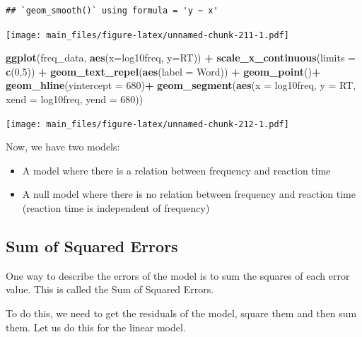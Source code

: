 \documentclass[
]{book}
\newenvironment{Shaded}{\begin{snugshade}}{\end{snugshade}}
\newcommand{\AttributeTok}[1]{\textcolor[rgb]{0.13,0.29,0.53}{#1}}
\newcommand{\DecValTok}[1]{\textcolor[rgb]{0.00,0.00,0.81}{#1}}
\newcommand{\FunctionTok}[1]{\textcolor[rgb]{0.13,0.29,0.53}{\textbf{#1}}}
\newcommand{\NormalTok}[1]{#1}
\newcommand{\SpecialCharTok}[1]{\textcolor[rgb]{0.81,0.36,0.00}{\textbf{#1}}}
\providecommand{\tightlist}{%
  \setlength{\itemsep}{0pt}\setlength{\parskip}{0pt}}
\begin{document}
\begin{verbatim}
## `geom_smooth()` using formula = 'y ~ x'
\end{verbatim}

\texttt{[image: main\_files/figure-latex/unnamed-chunk-211-1.pdf]}

\begin{Shaded}
\begin{Highlighting}[]
\FunctionTok{ggplot}\NormalTok{(freq\_data, }\FunctionTok{aes}\NormalTok{(}\AttributeTok{x=}\NormalTok{log10freq, }\AttributeTok{y=}\NormalTok{RT)) }\SpecialCharTok{+}
  \FunctionTok{scale\_x\_continuous}\NormalTok{(}\AttributeTok{limits =} \FunctionTok{c}\NormalTok{(}\DecValTok{0}\NormalTok{,}\DecValTok{5}\NormalTok{)) }\SpecialCharTok{+}
  \FunctionTok{geom\_text\_repel}\NormalTok{(}\FunctionTok{aes}\NormalTok{(}\AttributeTok{label =}\NormalTok{ Word)) }\SpecialCharTok{+}
  \FunctionTok{geom\_point}\NormalTok{()}\SpecialCharTok{+}
  \FunctionTok{geom\_hline}\NormalTok{(}\AttributeTok{yintercept =} \DecValTok{680}\NormalTok{)}\SpecialCharTok{+}
  \FunctionTok{geom\_segment}\NormalTok{(}\FunctionTok{aes}\NormalTok{(}\AttributeTok{x =}\NormalTok{ log10freq, }\AttributeTok{y =}\NormalTok{ RT,}
                   \AttributeTok{xend =}\NormalTok{ log10freq, }\AttributeTok{yend =} \DecValTok{680}\NormalTok{))}
\end{Highlighting}
\end{Shaded}

\texttt{[image: main\_files/figure-latex/unnamed-chunk-212-1.pdf]}

Now, we have two models:

\begin{itemize}
\tightlist
\item
  A model where there is a relation between frequency and reaction time
\item
  A null model where there is no relation between frequency and reaction time (reaction time is independent of frequency)
\end{itemize}

\subsection{Sum of Squared Errors}\label{sum-of-squared-errors}

One way to describe the errors of the model is to sum the squares of each error value. This is called the Sum of Squared Errors.

To do this, we need to get the residuals of the model, square them and then sum them. Let us do this for the linear model.
\end{document}
